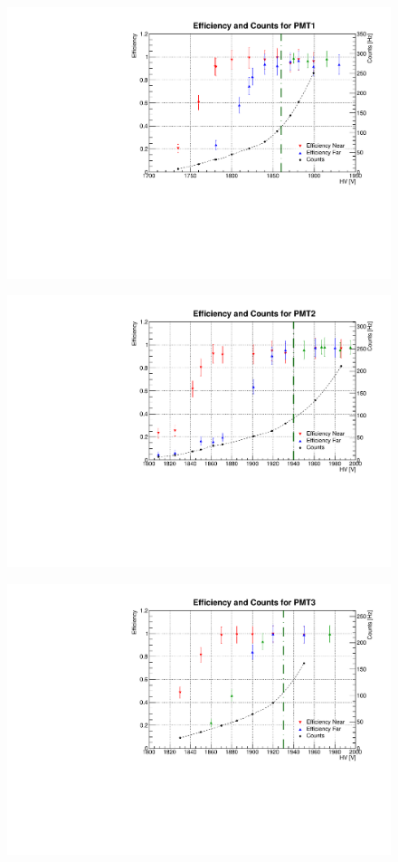 \begin{figure}[h]
	\centerline{\includegraphics[scale=0.7]{img/eff1.pdf}}
\end{figure}
\begin{figure}[h]
	\centerline{\includegraphics[scale=0.7]{img/eff2.pdf}}	
\end{figure}
\begin{figure}[h]
	\centerline{\includegraphics[scale=0.7]{img/eff3.pdf}}	
\end{figure}
